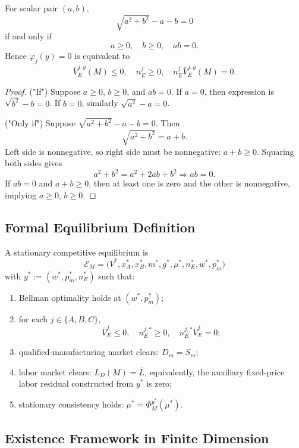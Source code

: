 \begin{lemma}
For scalar pair $(a,b)$,
\[
\sqrt{a^2+b^2}-a-b=0
\]
if and only if
\[
a\ge0,\quad b\ge0,\quad ab=0.
\]
Hence $\varphi_j(y)=0$ is equivalent to
\[
\bar V_E^{j,y}(M)\le0,\quad n_E^j\ge0,\quad n_E^j\bar V_E^{j,y}(M)=0.
\]
\end{lemma}

\begin{proof}
("If") Suppose $a\ge0$, $b\ge0$, and $ab=0$.
If $a=0$, then expression is $\sqrt{b^2}-b=0$. If $b=0$, similarly $\sqrt{a^2}-a=0$.

("Only if") Suppose $\sqrt{a^2+b^2}-a-b=0$. Then
\[
\sqrt{a^2+b^2}=a+b.
\]
Left side is nonnegative, so right side must be nonnegative: $a+b\ge0$. Squaring both sides gives
\[
a^2+b^2=a^2+2ab+b^2 \Rightarrow ab=0.
\]
If $ab=0$ and $a+b\ge0$, then at least one is zero and the other is nonnegative, implying $a\ge0$, $b\ge0$.
\end{proof}

\subsection{Formal Equilibrium Definition}

\begin{definition}
A stationary competitive equilibrium is
\[
\mathcal E_M=\bigl(V^*,x_A^*,x_B^*,m^*,g^*,\mu^*,n_E^*,w^*,p_m^*\bigr)
\]
with $y^*:=(w^*,p_m^*,n_E^*)$ such that:
\begin{enumerate}
    \item Bellman optimality holds at $(w^*,p_m^*)$;
    \item for each $j\in\{A,B,C\}$,
    \[
    \bar V_E^j\le0,\quad n_E^{j,*}\ge0,\quad n_E^{j,*}\bar V_E^j=0;
    \]
    \item qualified-manufacturing market clears: $D_m=S_m$;
    \item labor market clears: $L_D(M)=\bar L$, equivalently, the auxiliary fixed-price labor residual constructed from $y^*$ is zero;
    \item stationary consistency holds: $\mu^*=\Phi_M^{y^*}(\mu^*)$.
\end{enumerate}
\end{definition}

\subsection{Existence Framework in Finite Dimension}

